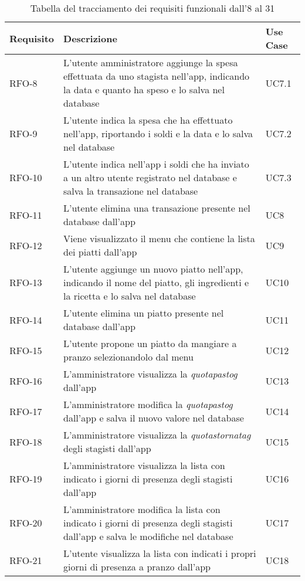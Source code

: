 \begin{table}%
\caption{Tabella del tracciamento dei requisiti funzionali dall'8 al 31}
\label{tab:requisiti-funzionalidue}
\begin{tabularx}{\textwidth}{lXl}
\hline
\textbf{Requisito} & \textbf{Descrizione} & \textbf{Use Case}\\
\hline\hline
RFO-8     & L'utente amministratore aggiunge la spesa effettuata da uno stagista nell'app, indicando la data e quanto ha speso e lo salva nel database & UC7.1 \\
\hline
RFO-9     & L'utente indica la spesa che ha effettuato nell'app, riportando i soldi e la data e lo salva nel database & UC7.2 \\
\hline
RFO-10    & L'utente indica nell'app i soldi che ha inviato a un altro utente registrato nel database e salva la transazione nel database & UC7.3 \\
\hline
RFO-11    & L'utente elimina una transazione presente nel database dall'app & UC8 \\
\hline
RFO-12    & Viene visualizzato il menu che contiene la lista dei piatti dall'app & UC9 \\
\hline
RFO-13    & L'utente aggiunge un nuovo piatto nell'app, indicando il nome del piatto, gli ingredienti e la ricetta e lo salva nel database & UC10 \\
\hline
RFO-14    & L'utente elimina un piatto presente nel database dall'app & UC11 \\
\hline
RFO-15    & L'utente propone un piatto da mangiare a pranzo selezionandolo dal menu & UC12 \\
\hline
RFO-16    & L'amministratore visualizza la \emph{\gls{quotapastog}} dall'app & UC13 \\
\hline
RFO-17    & L'amministratore modifica la \emph{\gls{quotapastog}} dall'app e salva il nuovo valore nel database & UC14 \\
\hline
RFO-18    & L'amministratore visualizza la \emph{\gls{quotastornatag}} degli stagisti dall'app & UC15 \\
\hline
RFO-19    & L'amministratore visualizza la lista con indicato i giorni di presenza degli stagisti dall'app & UC16 \\
\hline
RFO-20    & L'amministratore modifica la lista con indicato i giorni di presenza degli stagisti dall'app e salva le modifiche nel database & UC17 \\
\hline
RFO-21    & L'utente visualizza la lista con indicati i propri giorni di presenza a pranzo dall'app & UC18 \\

\end{tabularx}
\end{table}
